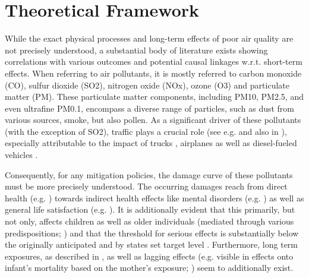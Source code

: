 \documentclass[12pt,a4paper]{article}
\begin{document}
\section{Theoretical Framework}
While the exact physical processes and long-term effects of poor air quality are not precisely understood, a substantial body of literature exists showing correlations with various outcomes and potential causal linkages w.r.t. short-term effects. When referring to air pollutants, it is mostly referred to carbon monoxide (CO), sulfur dioxide (SO2), nitrogen oxide (NOx), ozone (O3) and particulate matter (PM). These particulate matter components, including PM10, PM2.5, and even ultrafine PM0.1, encompass a diverse range of particles, such as dust from various sources, smoke, but also pollen. As a significant driver of these pollutants (with the exception of SO2), traffic plays a crucial role (see e.g. \citealp{thorpe2008,costa2017,zhong2017} and also in \citealp{bauernschuster2017}), especially attributable to the impact of trucks \citep{lena2002}, airplanes \citep{schlenker2016} as well as diesel-fueled vehicles \citep{kinney2000}.

Consequently, for any mitigation policies, the damage curve of these pollutants must be more precisely understood. The occurring damages reach from direct health (e.g. \citealp{schlenker2016,kampa2008,chen2021}) towards indirect health effects like mental disorders (e.g. \citealp{pedersen2004,szyszkowicz2007,zhang2017}) as well as general life satisfaction (e.g. \citealp{mackerron2009,rehdanz2008,szyszkowicz2007}).  It is additionally evident that this primarily, but not only, affects children \citep{beatty2014} as well as older individuals (mediated through various predispositions; \citealp{peled2011}) and that the threshold for serious effects is substantially below the originally anticipated and by states set target level \citep{beelen2014}. Furthermore, long term exposures, as described in \citet{beelen2014}, as well as lagging effects (e.g. visible in effects onto infant's mortality based on the mother's exposure; \citealp{chay2003}) seem to additionally exist.
\end{document}

